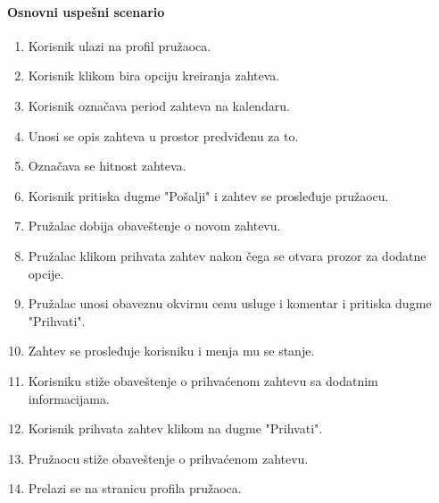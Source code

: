 \documentclass[a4paper,12pt]{report}
\begin{document}
			\paragraph*{Osnovni uspešni scenario}
				\begin{enumerate}
					\item Korisnik ulazi na profil pružaoca.
					\item Korisnik klikom bira opciju kreiranja zahteva.
					\item Korisnik označava period zahteva na kalendaru.
					\item Unosi se opis zahteva u prostor predviđenu za to.
					\item Označava se hitnost zahteva.
					\item Korisnik pritiska dugme "Pošalji" i zahtev se prosleđuje pružaocu.
					\item Pružalac dobija obaveštenje o novom zahtevu.
					\item Pružalac klikom prihvata zahtev nakon čega se otvara prozor za dodatne opcije.
					\item Pružalac unosi obaveznu okvirnu cenu usluge i komentar i pritiska dugme "Prihvati".
					\item Zahtev se prosleđuje korisniku i menja mu se stanje.
					\item Korisniku stiže obaveštenje o prihvaćenom zahtevu sa dodatnim informacijama.
					\item Korisnik prihvata zahtev klikom na dugme "Prihvati".
					\item Pružaocu stiže obaveštenje o prihvaćenom zahtevu.
					\item Prelazi se na stranicu profila pružaoca.
				\end{enumerate}
\end{document}
